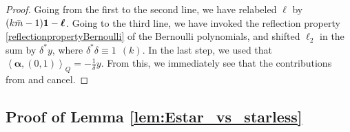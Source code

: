 \documentclass[10pt,a4paper]{amsart}
\def\bal{\boldsymbol{\alpha}}
\def\bol{\boldsymbol{\ell}}
\theoremstyle{definition}
\numberwithin{equation}{section}
\begin{document}
\begin{proof}
Going from the first to the second line, we have relabeled $\bol$ by $(k\bar m-1){\bf 1}-\bol$. Going to the third line, we have invoked the reflection property \eqref{reflectionpropertyBernoulli} of the Bernoulli polynomials, and shifted $\ell_2$ in the sum by $\delta^\ast y$, where $\delta^\ast \delta \equiv 1 ~~(k) $. In the last step, we used that $\left<\bal,(0,1)\right>_Q = -{\frac{1}{\delta} } y$. From this, we immediately see that the contributions from \smash{$\bal_w^{(1)}$} and \smash{$\bal_w^{(2)}$} cancel.
\end{proof}

\subsection{Proof of Lemma \ref{lem:Estar_vs_starless}}\label{apx:proofEstar_vs_starless}
\end{document}
